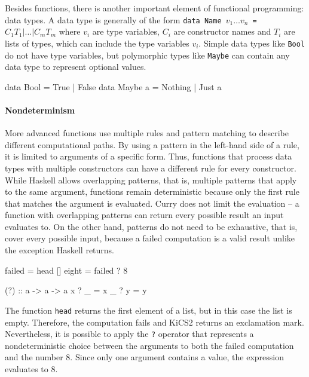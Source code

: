 \documentclass[paper = a4, fleqn, twoside]{scrreprt}
\newcommand{\coqinline}[1]{\texttt{#1}}
\begin{document}
\par \noindent
Besides functions, there is another important element of functional programming: data types. A data type is generally of the form \texttt{data Name $v_1 \dots v_n$ = $C_1 T_1 | \dots | C_m T_m$} where $v_i$ are type variables, $C_i$ are constructor names and $T_i$ are lists of types, which can include the type variables $v_i$. Simple data types like \coqinline{Bool} do not have type variables, but polymorphic types like \coqinline{Maybe} can contain any data type to represent optional values.
\begin{haskellcode}
data Bool = True | False
data Maybe a = Nothing | Just a
\end{haskellcode}
\paragraph{Nondeterminism}
More advanced functions use multiple rules and pattern matching to describe different computational paths. By using a pattern in the left-hand side of a rule, it is limited to arguments of a specific form. Thus, functions that process data types with multiple constructors can have a different rule for every constructor. While Haskell allows overlapping patterns, that is, multiple patterns that apply to the same argument, functions remain deterministic because only the first rule that matches the argument is evaluated. Curry does not limit the evaluation -- a function with overlapping patterns can return every possible result an input evaluates to. On the other hand, patterns do not need to be exhaustive, that is, cover every possible input, because a failed computation is a valid result unlike the exception Haskell returns.
\begin{flushleft}
	\begin{minipage}[t]{.3 \linewidth}
		\begin{haskellcode}
failed = head []
eight = failed ? 8
		\end{haskellcode}
	\end{minipage}
	\hfill
	\vrule
	\hspace{.5 em}
	\begin{minipage}[t]{.65 \linewidth}
		\begin{haskellcode}
(?) :: a -> a -> a
x ? _ = x
_ ? y = y
		\end{haskellcode}
	\end{minipage}
\end{flushleft}
\noindent
The function \texttt{head} returns the first element of a list, but in this case the list is empty. Therefore, the computation fails and KiCS2 returns an exclamation mark. Nevertheless, it is possible to apply the \texttt{?} operator that represents a nondeterministic choice between the arguments to both the failed computation and the number 8. Since only one argument contains a value, the expression evaluates to 8.
\end{document}
